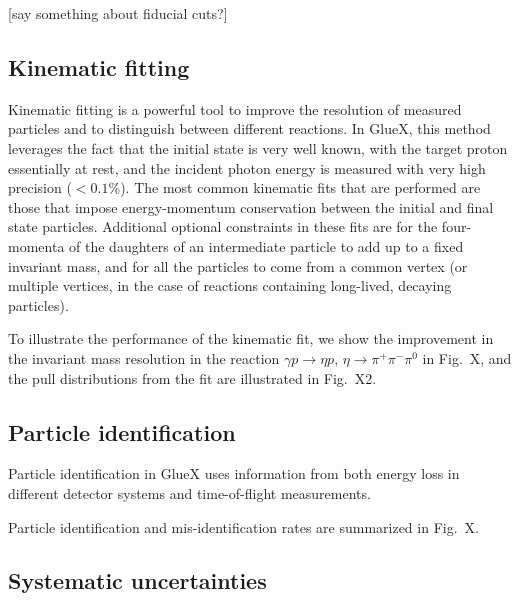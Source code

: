 [say something about fiducial cuts?]

\subsection{Kinematic fitting \label{sec:perffitting}}

Kinematic fitting is a powerful tool to improve the resolution of measured particles and to distinguish between different reactions.  In GlueX, this method leverages the fact that the initial state is very well known, with the target proton essentially at rest, and the incident photon energy is measured with very high precision ($<0.1\%$).  The most common kinematic fits that are performed are those that impose energy-momentum conservation between the initial and final state particles.  Additional optional constraints in these fits are for the four-momenta of the daughters of an intermediate particle to add up to a fixed invariant mass, and for all the particles to come from a common vertex (or multiple vertices, in the case of reactions containing long-lived, decaying particles).

To illustrate the performance of the kinematic fit, we show the improvement in the invariant mass resolution in the reaction $\gamma p \to \eta p$, $\eta \to \pi^+\pi^-\pi^0$ in Fig.~X, and the pull distributions from the fit are illustrated in Fig.~X2.

\subsection{Particle identification \label{sec:perfpid}}

Particle identification in GlueX uses information from both energy loss in different detector systems and time-of-flight measurements.


Particle identification and mis-identification rates are summarized in Fig.~X.

\subsection{Systematic uncertainties \label{sec:systematics}}
